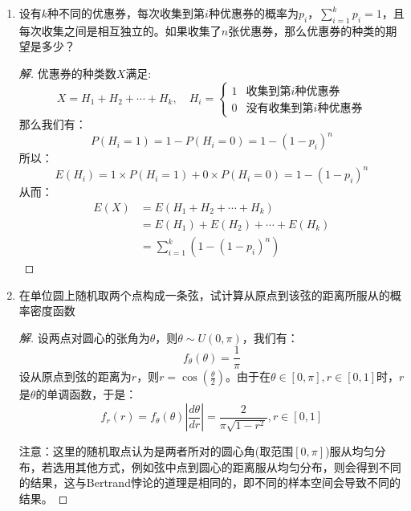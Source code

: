 \documentclass[12pt]{article}
\newcommand{\hei}{\CJKfamily{hei}}                          %
\begin{document}
\begin{enumerate}
\item {\hei 设有$k$种不同的优惠券，每次收集到第$i$种优惠券的概率为$p_i$，$\sum_{i=1}^kp_i=1$，且每次收集之间是相互独立的。如果收集了$n$张优惠券，那么优惠券的种类的期望是多少？}
\begin{proof}[解]
	优惠券的种类数$X$满足:
	\begin{equation}
	X=H_1+H_2+\cdots+H_k,\quad H_i=\left\{
	\begin{array}{cc}
	1 & \mbox{收集到第$i$种优惠券}\\
	0 & \mbox{没有收集到第$i$种优惠券}
	\end{array}
	\right.
	\end{equation}
	那么我们有：
	\begin{equation}
	P(H_i=1)=1-P(H_i=0)=1-(1-p_i)^n
	\end{equation}
	所以：
	\begin{equation}
	E(H_i)=1\times P(H_i=1)+0\times P(H_i=0)=1-(1-p_i)^n
	\end{equation}
	从而：
	\begin{equation}
	\begin{aligned}
		E(X)&=E(H_1+H_2+\cdots+H_k)\\
		&=E(H_1)+E(H_2)+\cdots+E(H_k) \\
		&=\sum_{i=1}^{k}\left(1-(1-p_i)^n\right)
	\end{aligned}
	\end{equation}
\end{proof}

\item {\hei 在单位圆上随机取两个点构成一条弦，试计算从原点到该弦的距离所服从的概率密度函数}
\begin{proof}[解]
	设两点对圆心的张角为$\theta$，则$\theta\sim U(0,\pi)$，我们有：
	\begin{equation}
	f_\theta(\theta)=\frac{1}{\pi}
	\end{equation}
	设从原点到弦的距离为$r$，则$r=\cos\left(\frac{\theta}{2}\right)$。由于在$\theta\in[0,\pi],r\in[0,1]$时，$r$是$\theta$的单调函数，于是：
	\begin{equation}
	f_r(r)=f_\theta(\theta)\left|\frac{d\theta}{dr}\right|=\frac{2}{\pi\sqrt{1-r^2}},r\in[0,1]
	\end{equation}
	
	{\hei 注意}：这里的随机取点认为是两者所对的圆心角(取范围$[0,\pi]$)服从均匀分布，若选用其他方式，例如弦中点到圆心的距离服从均匀分布，则会得到不同的结果，这与Bertrand悖论的道理是相同的，即不同的样本空间会导致不同的结果。

\end{proof}
\end{enumerate}
\end{document}
